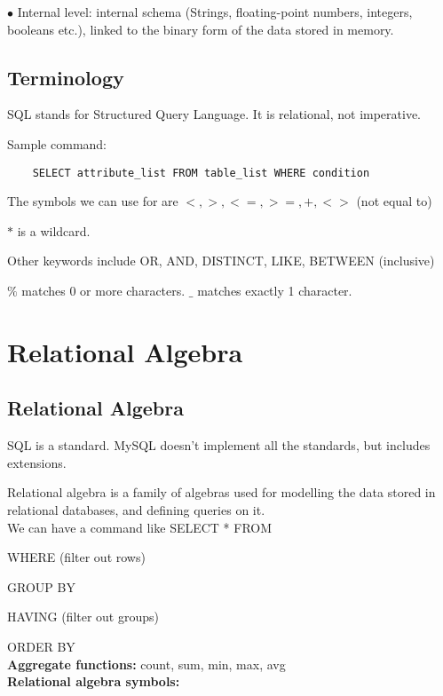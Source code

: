 \documentclass[english,openany]{book}
\begin{document}
    $\bullet$ Internal level: internal schema (Strings, floating-point numbers, integers, booleans etc.), linked to the binary form of the data stored in memory.

    \section{Terminology}

    SQL stands for Structured Query Language. It is relational, not imperative.

    Sample command:

    \begin{lstlisting}
    SELECT attribute_list FROM table_list WHERE condition
    \end{lstlisting}

    The symbols we can use for are $<, >, <=, >=, +, <>$ (not equal to)

    $*$ is a wildcard.

    Other keywords include OR, AND, DISTINCT, LIKE, BETWEEN (inclusive)

    $\%$ matches 0 or more characters. $\_$ matches exactly 1 character.

    \chapter{Relational Algebra}

    \section{Relational Algebra}

    SQL is a standard. MySQL doesn't implement all the standards, but includes extensions.

    Relational algebra is a family of algebras used for modelling the data stored in relational databases, and defining queries on it.\\

    We can have a command like SELECT * FROM

    WHERE (filter out rows)

    GROUP BY

    HAVING (filter out groups)

    ORDER BY\\

    \textbf{Aggregate functions:} count, sum, min, max, avg\\

    \textbf{Relational algebra symbols:}
\end{document}
